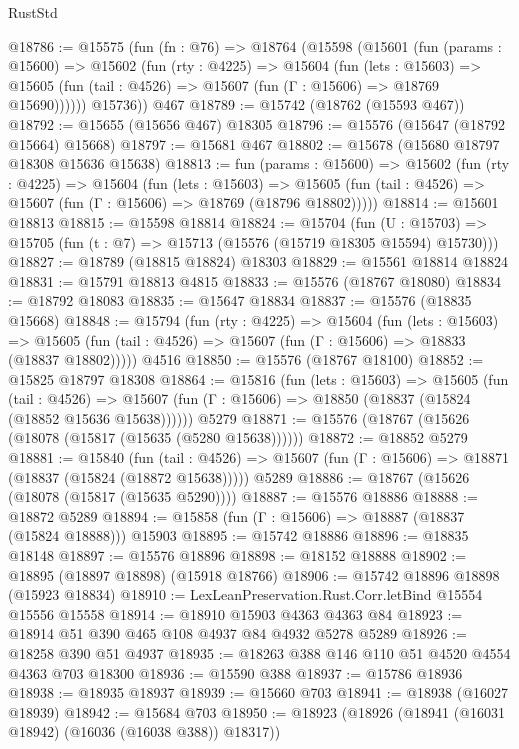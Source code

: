 \begin{lexlean}{RustStd}
\begin{coremodule}
@18786 := @15575
    (fun (fn : @76) =>
    @18764
      (@15598
        (@15601
          (fun (params : @15600) =>
          @15602
            (fun (rty : @4225) =>
            @15604
              (fun (lets : @15603) =>
              @15605 (fun (tail : @4526) => @15607 (fun (Γ : @15606) => @18769 @15690))))))
        @15736))
    @467
@18789 := @15742 (@18762 (@15593 @467))
@18792 := @15655 (@15656 @467) @18305
@18796 := @15576 (@15647 (@18792 @15664) @15668)
@18797 := @15681 @467
@18802 := @15678 (@15680 @18797 @18308 @15636 @15638)
@18813 := fun (params : @15600) =>
  @15602
    (fun (rty : @4225) =>
    @15604
      (fun (lets : @15603) =>
      @15605 (fun (tail : @4526) => @15607 (fun (Γ : @15606) => @18769 (@18796 @18802)))))
@18814 := @15601 @18813
@18815 := @15598 @18814
@18824 := @15704
    (fun (U : @15703) => @15705 (fun (t : @7) => @15713 (@15576 (@15719 @18305 @15594) @15730)))
@18827 := @18789 (@18815 @18824) @18303
@18829 := @15561 @18814 @18824
@18831 := @15791 @18813 @4815
@18833 := @15576 (@18767 @18080)
@18834 := @18792 @18083
@18835 := @15647 @18834
@18837 := @15576 (@18835 @15668)
@18848 := @15794
    (fun (rty : @4225) =>
    @15604
      (fun (lets : @15603) =>
      @15605 (fun (tail : @4526) => @15607 (fun (Γ : @15606) => @18833 (@18837 @18802)))))
    @4516
@18850 := @15576 (@18767 @18100)
@18852 := @15825 @18797 @18308
@18864 := @15816
    (fun (lets : @15603) =>
    @15605
      (fun (tail : @4526) =>
      @15607 (fun (Γ : @15606) => @18850 (@18837 (@15824 (@18852 @15636 @15638))))))
    @5279
@18871 := @15576 (@18767 (@15626 (@18078 (@15817 (@15635 (@5280 @15638))))))
@18872 := @18852 @5279
@18881 := @15840
    (fun (tail : @4526) => @15607 (fun (Γ : @15606) => @18871 (@18837 (@15824 (@18872 @15638)))))
    @5289
@18886 := @18767 (@15626 (@18078 (@15817 (@15635 @5290))))
@18887 := @15576 @18886
@18888 := @18872 @5289
@18894 := @15858 (fun (Γ : @15606) => @18887 (@18837 (@15824 @18888))) @15903
@18895 := @15742 @18886
@18896 := @18835 @18148
@18897 := @15576 @18896
@18898 := @18152 @18888
@18902 := @18895 (@18897 @18898) (@15918 @18766)
@18906 := @15742 @18896 @18898 (@15923 @18834)
@18910 := LexLeanPreservation.Rust.Corr.letBind @15554 @15556 @15558
@18914 := @18910 @15903 @4363 @4363 @84
@18923 := @18914 @51 @390 @465 @108 @4937 @84 @4932 @5278 @5289
@18926 := @18258 @390 @51 @4937
@18935 := @18263 @388 @146 @110 @51 @4520 @4554 @4363 @703 @18300
@18936 := @15590 @388
@18937 := @15786 @18936
@18938 := @18935 @18937
@18939 := @15660 @703
@18941 := @18938 (@16027 @18939)
@18942 := @15684 @703
@18950 := @18923 (@18926 (@18941 (@16031 @18942) (@16036 (@16038 @388)) @18317))

\end{coremodule}
\end{lexlean}
